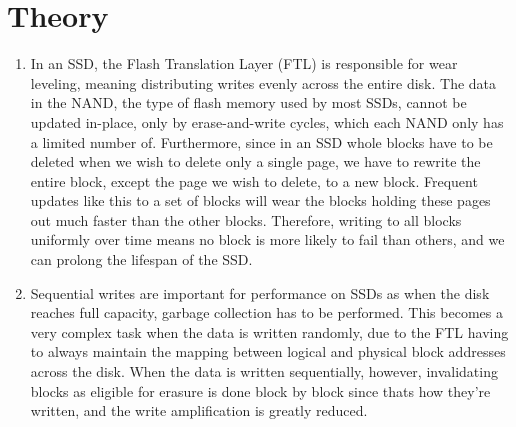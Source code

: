 \section{Theory}

\begin{enumerate}
    \item 
        In an SSD, the Flash Translation Layer (FTL) is responsible for wear 
        leveling, meaning distributing writes evenly across the entire disk. The 
        data in the NAND, the type of flash memory used by most SSDs, cannot be 
        updated in-place, only by erase-and-write cycles, which each NAND only 
        has a limited number of. Furthermore, since in an SSD whole blocks have 
        to be deleted when we wish to delete only a single page, we have to 
        rewrite the entire block, except the page we wish to delete, to a new 
        block. Frequent updates like this to a set of blocks will wear the 
        blocks holding these pages out much faster than the other blocks. 
        Therefore, writing to all blocks uniformly over time means no block is 
        more likely to fail than others, and we can prolong the lifespan of the
        SSD.
    \item 
        Sequential writes are important for performance on SSDs as when the disk
        reaches full capacity, garbage collection has to be performed. This
        becomes a very complex task when the data is written randomly, due to 
        the FTL having to always maintain the mapping between logical and 
        physical block addresses across the disk. When the data is written 
        sequentially, however, invalidating blocks as eligible for erasure is 
        done block by block since thats how they're written, and the write 
        amplification is greatly reduced.
        

\end{enumerate}
